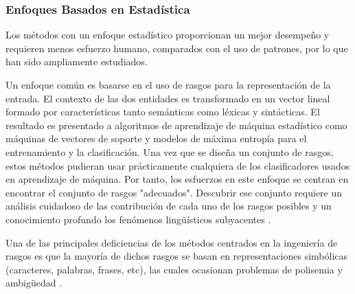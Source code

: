 \subsubsection{Enfoques Basados en Estadística}

Los métodos con un enfoque estadístico proporcionan un mejor desempeño y requieren menos esfuerzo humano, comparados con el uso de patrones, por lo que han sido ampliamente estudiados.

Un enfoque común es basarse en el uso de rasgos para la representación de la entrada. El contexto de las dos entidades es transformado en un vector lineal formado por características tanto semánticas como léxicas y sintácticas. El resultado es presentado a  algoritmos de aprendizaje de máquina estadístico como máquinas de vectores de soporte  y modelos de máxima entropía  para el entrenamiento y la clasificación. Una vez que se diseña un conjunto de rasgos, estos métodos pudieran usar prácticamente cualquiera de los clasificadores usados en aprendizaje de máquina. Por tanto, los esfuerzos en este enfoque se centran en encontrar el conjunto de rasgos "adecuados". Descubrir ese conjunto requiere un análisis cuidadoso de las contribución de cada uno de los rasgos posibles y un conocimiento profundo los fenómenos lingüísticos subyacentes .

Una de las principales deficiencias de los métodos centrados en la ingeniería de rasgos es que la mayoría de dichos rasgos se basan en representaciones simbólicas (caracteres, palabras, frases, etc), las cuales ocasionan problemas de polisemia y ambig\"uedad \cite{liu2020survey}.




